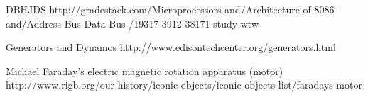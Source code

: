 \clearpage
\newpage
{}
    \begin{thebibliography}{9}

         DBHJDS
        http://gradestack.com/Microprocessors-and/Architecture-of-8086-and/Address-Bus-Data-Bus-/19317-3912-38171-study-wtw

         Generators and Dynamos
        http://www.edisontechcenter.org/generators.html

         Michael Faraday's electric magnetic rotation apparatus (motor)\\
        http://www.rigb.org/our-history/iconic-objects/iconic-objects-list/faradays-motor

    \end{thebibliography}

